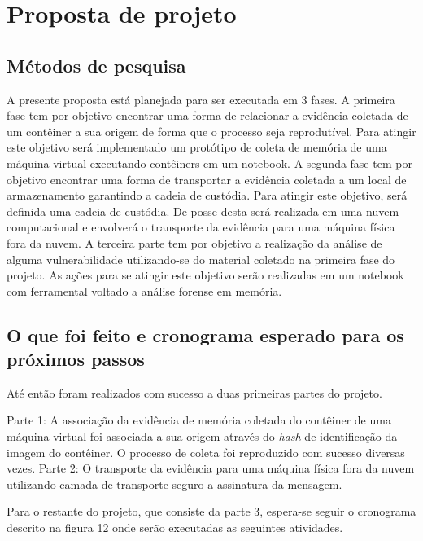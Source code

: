 \chapter{Proposta de projeto}
\label{chp:proposta}

\section{Métodos de pesquisa}
\label{sec:métodos}

A presente proposta está planejada para ser executada em 3 fases.
%
A primeira fase tem por objetivo encontrar uma forma de relacionar a evidência coletada de um contêiner a sua origem de forma que o processo seja reprodutível. 
%
Para atingir este objetivo será implementado um protótipo de coleta de memória de uma máquina virtual executando contêiners em um notebook.
%
A segunda fase tem por objetivo encontrar uma forma de transportar a evidência coletada a um local de armazenamento garantindo a cadeia de custódia.
%
Para atingir este objetivo, será definida uma cadeia de custódia. De posse desta será realizada em uma nuvem computacional e envolverá o transporte da evidência para uma máquina física fora da nuvem.
%
A terceira parte tem por objetivo a realização da análise de alguma vulnerabilidade utilizando-se do material coletado na primeira fase do projeto.
%
As ações para se atingir este objetivo serão realizadas em um notebook com ferramental voltado a análise forense em memória.

\section{O que foi feito e cronograma esperado para os próximos passos}
\label{sec:até_agora}

Até então foram realizados com sucesso a duas primeiras partes do projeto.

%
Parte 1: A associação da evidência de memória coletada do contêiner de uma máquina virtual foi associada a sua origem através do \textit{hash} de identificação da imagem do contêiner. O processo de coleta foi reproduzido com sucesso diversas vezes.
%
Parte 2: O transporte da evidência para uma máquina física fora da nuvem utilizando camada de transporte seguro a assinatura da mensagem.
%

Para o restante do projeto, que consiste da parte 3, espera-se seguir o cronograma descrito na figura 12 onde serão executadas as seguintes atividades.

